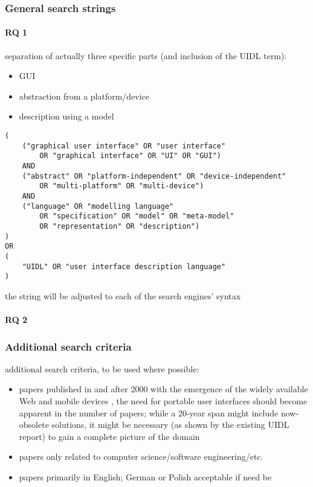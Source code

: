 \subsubsection{General search strings}

\paragraph{RQ 1}

separation of actually three specific parts (and inclusion of the UIDL term):
\begin{itemize}
    \item GUI
    \item abstraction from a platform/device
    \item description using a model
\end{itemize}

\begin{listing}
    \begin{verbatim}
(
    ("graphical user interface" OR "user interface"
        OR "graphical interface" OR "UI" OR "GUI")
    AND
    ("abstract" OR "platform-independent" OR "device-independent"
        OR "multi-platform" OR "multi-device")
    AND
    ("language" OR "modelling language"
        OR "specification" OR "model" OR "meta-model"
        OR "representation" OR "description")
)
OR
(
    "UIDL" OR "user interface description language"
)
    \end{verbatim}
\end{listing}

the string will be adjusted to each of the search engines' syntax

\paragraph{RQ 2}

\subsubsection{Additional search criteria}

additional search criteria, to be used where possible:
\begin{itemize}
    \item papers published in and after 2000 \textendash with the emergence of the widely available Web and mobile devices , the need for portable user interfaces should become apparent in the number of papers;
    while a 20-year span might include now-obsolete solutions, it might be necessary (as shown by the existing UIDL report) to gain a complete picture of the domain
    \item papers only related to computer science/software engineering/etc.
    \item papers primarily in English;
    German or Polish acceptable if need be
\end{itemize}

